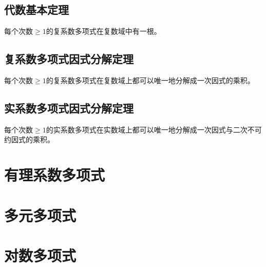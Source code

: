 \documentclass{article}%
\begin{document}
\subsection{代数基本定理}
每个次数$ \ge 1$的复系数多项式在复数域中有一根。

\subsection{复系数多项式因式分解定理}
每个次数$ \ge 1$的复系数多项式在复数域上都可以唯一地分解成一次因式的乘积。

\subsection{实系数多项式因式分解定理}
每个次数$ \ge 1$的实系数多项式在实数域上都可以唯一地分解成一次因式与二次不可约因式的乘积。


\section{有理系数多项式}



\section{多元多项式}
\section{对数多项式}
\end{document}
